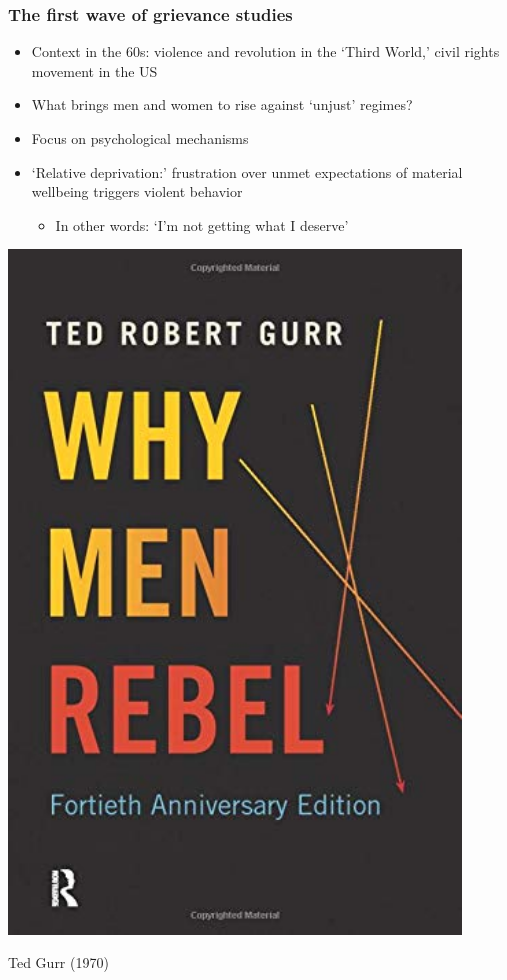 \documentclass[utf8, xcolor=dvipsnames]{beamer}
\begin{document}
\begin{frame}
\frametitle{The first wave of grievance studies}
\centering

\begin{minipage}{0.59\textwidth}\centering
\begin{itemize}[<+->]
  \item Context in the 60s: violence and revolution in the `Third World,' civil rights movement in the US
  \item What brings men and women to rise against `unjust' regimes?
  \item Focus on psychological mechanisms
  \item `Relative deprivation:' frustration over unmet expectations of material wellbeing triggers violent behavior
  \begin{itemize}
    \item In other words: `I'm not getting what I deserve'
  \end{itemize}
\end{itemize}
\end{minipage}\hfill
\begin{minipage}{0.4\textwidth}\centering
\includegraphics[width = 0.9\textwidth]{img/why_men_rebel}

Ted Gurr (1970)
\end{minipage}

\end{frame}
\end{document}
